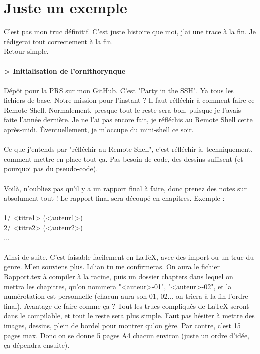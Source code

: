 
\chapter[Exemple]{Juste un exemple}

C'est pas mon truc définitif. C'est juste histoire que moi, j'ai une trace à la fin. Je rédigerai tout correctement à la fin.
\\Retour simple.
\\\\
\textbf{> Initialisation de l'ornithorynque}
\\\\
Dépôt pour la PRS sur mon GitHub. C'est "Party in the SSH". Ya tous les fichiers de base. Notre mission pour l'instant ? Il faut réfléchir à comment faire ce Remote Shell.
Normalement, presque tout le reste sera bon, puisque je l'avais faite l'année dernière. Je ne l'ai pas encore fait, je réfléchis au Remote Shell cette après-midi. Éventuellement, je m'occupe du mini-shell ce soir.
\\\\
Ce que j'entends par "réfléchir au Remote Shell", c'est réfléchir à, techniquement, comment mettre en place tout ça. Pas besoin de code, des dessins suffisent (et pourquoi pas du pseudo-code).
\\\\
Voilà, n'oubliez pas qu'il y a un rapport final à faire, donc prenez des notes sur absolument tout ! Le rapport final sera découpé en chapitres. Exemple :
\\\\
1/ <titre1> (<auteur1>)
\\2/ <titre2> (<auteur2>)
\\...
\\\\
Ainsi de suite. C'est faisable facilement en LaTeX, avec des import ou un truc du genre. M'en souviens plus. Lilian tu me confirmeras. On aura le fichier Rapport.tex à compiler à la racine, puis un dossier chapters dans lequel on mettra les chapitres, qu'on nommera "<auteur>-01", "<auteur>-02", et la numérotation est personnelle (chacun aura son 01, 02... on triera à la fin l'ordre final). Avantage de faire comme ça ? Tout les trucs compliqués de LaTeX seront dans le compilable, et tout le reste sera plus simple. Faut pas hésiter à mettre des images, dessins, plein de bordel pour montrer qu'on gère. Par contre, c'est 15 pages max. Donc on se donne 5 pages A4 chacun environ (juste un ordre d'idée, ça dépendra ensuite).
\\\\
